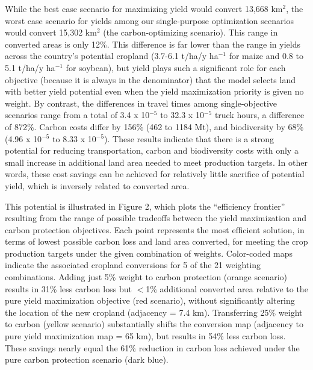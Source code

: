 \documentclass[a4paper]{article}
\begin{document}
{While the best case scenario for maximizing yield would convert 13,668 km$^2$, the worst case scenario for yields among our single-purpose optimization scenarios would convert 15,302 km$^2$ (the carbon-optimizing scenario). This range in converted areas is only 12\%. This difference is far lower than the range in yields across the country's potential cropland (3.7-6.1 t/ha/y ha$^{-1}$ for maize and 0.8 to 5.1 t/ha/y ha$^{-1}$ for soybean), but yield plays such a significant role for each objective (because it is always in the denominator) that the model selects land with better yield potential even when the yield maximization priority is given no weight.  By contrast, the differences in travel times among single-objective scenarios range from a total of 3.4 x 10$^{-5}$ to 32.3 x 10$^{-5}$ truck hours, a difference of 872\%.  Carbon costs differ by 156\% (462 to 1184 Mt), and biodiversity by 68\% (4.96 x 10$^{-5}$ to 8.33 x 10$^{-5}$).  These results indicate that there is a strong potential for reducing transportation, carbon and biodiversity costs with only a small increase in additional land area needed to meet production targets. In other words, these cost savings can be achieved for relatively little sacrifice of potential yield, which is inversely related to converted area.   

This potential is illustrated in Figure 2, which plots the ``efficiency frontier'' \citep{polasky_where_2008} resulting from the range of possible tradeoffs between the yield maximization and carbon protection objectives. Each point represents the most efficient solution, in terms of lowest possible carbon loss and land area converted, for meeting the crop production targets under the given combination of weights. Color-coded maps indicate the associated cropland conversions for 5 of the 21 weighting combinations. Adding just 5\% weight to carbon protection (orange scenario) results in 31\% less carbon loss but $<$1\% additional converted area relative to the pure yield maximization objective (red scenario), without significantly altering the location of the new cropland (adjacency = 7.4 km). Transferring 25\% weight to carbon (yellow scenario) substantially shifts the conversion map (adjacency to pure yield maximization map = 65 km), but results in 54\% less carbon loss. These savings nearly equal the 61\% reduction in carbon loss achieved under the pure carbon protection scenario (dark blue).

}
\end{document}
